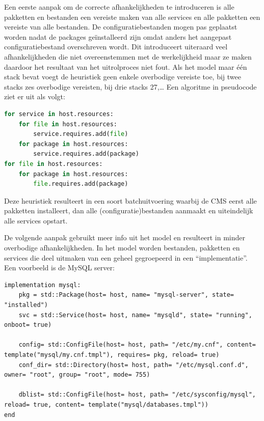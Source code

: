 Een eerste aanpak om de correcte afhankelijkheden te introduceren is alle pakketten en bestanden een vereiste maken van alle services en alle pakketten een vereiste van alle bestanden.
De configuratiebestanden mogen pas geplaatst worden nadat de packages ge\"installeerd zijn omdat anders het aangepast configuratiebestand overschreven wordt.
Dit introduceert uiteraard veel afhankelijkheden die niet overeenstemmen met de werkelijkheid maar ze maken daardoor het resultaat van het uitrolproces niet fout.
Als het model maar \'e\'en stack bevat voegt de heuristiek geen enkele overbodige vereiste toe, bij twee stacks zes overbodige vereisten, bij drie stacks 27,\ldots
Een algoritme in pseudocode ziet er uit als volgt:

\begin{minipage}{\textwidth}
\begin{lstlisting}[language=Python]
for service in host.resources:
    for file in host.resources:
        service.requires.add(file)
    for package in host.resources:
        service.requires.add(package)
for file in host.resources:
    for package in host.resources:
        file.requires.add(package)
\end{lstlisting}
\end{minipage}

Deze heuristiek resulteert in een soort batchuitvoering waarbij de CMS  eerst alle pakketten installeert, dan alle (configuratie)bestanden aanmaakt en uiteindelijk alle services opstart.

De volgende aanpak gebruikt meer info uit het model en resulteert in minder overbodige afhankelijkheden.
In het model worden bestanden, pakketten en services die deel uitmaken van een geheel gegroepeerd in een ``implementatie''.
Een voorbeeld is de MySQL server:

\begin{minipage}{\textwidth}
\begin{lstlisting}
implementation mysql:
    pkg = std::Package(host= host, name= "mysql-server", state= "installed")
    svc = std::Service(host= host, name= "mysqld", state= "running", onboot= true)

    config= std::ConfigFile(host= host, path= "/etc/my.cnf", content= template("mysql/my.cnf.tmpl"), requires= pkg, reload= true)
    conf_dir= std::Directory(host= host, path= "/etc/mysql.conf.d", owner= "root", group= "root", mode= 755)

    dblist= std::ConfigFile(host= host, path= "/etc/sysconfig/mysql", reload= true, content= template("mysql/databases.tmpl"))
end
\end{lstlisting}
\end{minipage}

